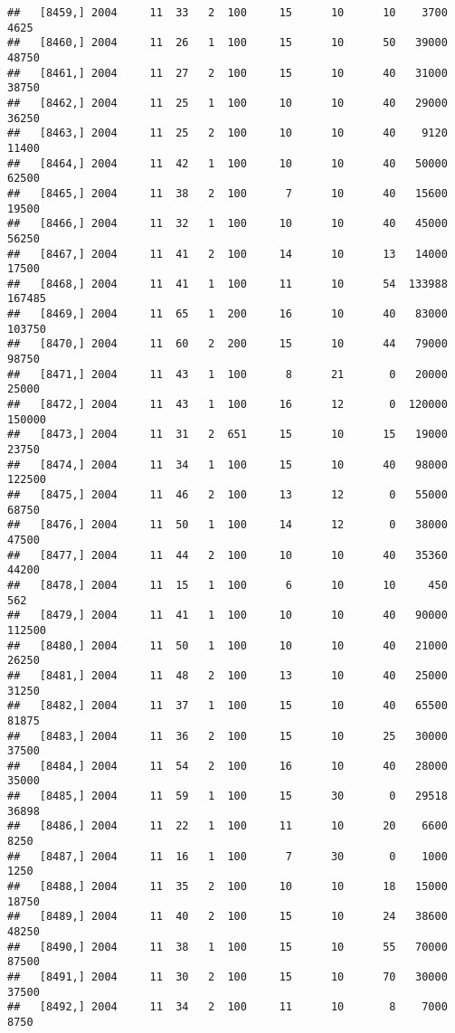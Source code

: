 \documentclass{article}\usepackage[]{graphicx}\usepackage[]{color}
\makeatletter
\newenvironment{kframe}{%
 \def\at@end@of@kframe{}%
 \ifinner\ifhmode%
  \def\at@end@of@kframe{\end{minipage}}%
  \begin{minipage}{\columnwidth}%
 \fi\fi%
 \def\FrameCommand##1{\hskip\@totalleftmargin \hskip-\fboxsep
 \colorbox{shadecolor}{##1}\hskip-\fboxsep
     \hskip-\linewidth \hskip-\@totalleftmargin \hskip\columnwidth}%
 \MakeFramed {\advance\hsize-\width
   \@totalleftmargin\z@ \linewidth\hsize
   \@setminipage}}%
 {\par\unskip\endMakeFramed%
 \at@end@of@kframe}
\newenvironment{knitrout}{}{} %
\makeatother
\begin{document}
\begin{knitrout}
\begin{kframe}
\begin{verbatim}
##   [8459,] 2004     11  33   2  100     15      10      10    3700    4625
##   [8460,] 2004     11  26   1  100     15      10      50   39000   48750
##   [8461,] 2004     11  27   2  100     15      10      40   31000   38750
##   [8462,] 2004     11  25   1  100     10      10      40   29000   36250
##   [8463,] 2004     11  25   2  100     10      10      40    9120   11400
##   [8464,] 2004     11  42   1  100     10      10      40   50000   62500
##   [8465,] 2004     11  38   2  100      7      10      40   15600   19500
##   [8466,] 2004     11  32   1  100     10      10      40   45000   56250
##   [8467,] 2004     11  41   2  100     14      10      13   14000   17500
##   [8468,] 2004     11  41   1  100     11      10      54  133988  167485
##   [8469,] 2004     11  65   1  200     16      10      40   83000  103750
##   [8470,] 2004     11  60   2  200     15      10      44   79000   98750
##   [8471,] 2004     11  43   1  100      8      21       0   20000   25000
##   [8472,] 2004     11  43   1  100     16      12       0  120000  150000
##   [8473,] 2004     11  31   2  651     15      10      15   19000   23750
##   [8474,] 2004     11  34   1  100     15      10      40   98000  122500
##   [8475,] 2004     11  46   2  100     13      12       0   55000   68750
##   [8476,] 2004     11  50   1  100     14      12       0   38000   47500
##   [8477,] 2004     11  44   2  100     10      10      40   35360   44200
##   [8478,] 2004     11  15   1  100      6      10      10     450     562
##   [8479,] 2004     11  41   1  100     10      10      40   90000  112500
##   [8480,] 2004     11  50   1  100     10      10      40   21000   26250
##   [8481,] 2004     11  48   2  100     13      10      40   25000   31250
##   [8482,] 2004     11  37   1  100     15      10      40   65500   81875
##   [8483,] 2004     11  36   2  100     15      10      25   30000   37500
##   [8484,] 2004     11  54   2  100     16      10      40   28000   35000
##   [8485,] 2004     11  59   1  100     15      30       0   29518   36898
##   [8486,] 2004     11  22   1  100     11      10      20    6600    8250
##   [8487,] 2004     11  16   1  100      7      30       0    1000    1250
##   [8488,] 2004     11  35   2  100     10      10      18   15000   18750
##   [8489,] 2004     11  40   2  100     15      10      24   38600   48250
##   [8490,] 2004     11  38   1  100     15      10      55   70000   87500
##   [8491,] 2004     11  30   2  100     15      10      70   30000   37500
##   [8492,] 2004     11  34   2  100     11      10       8    7000    8750

\end{verbatim}
\end{kframe}
\end{knitrout}
\end{document}
